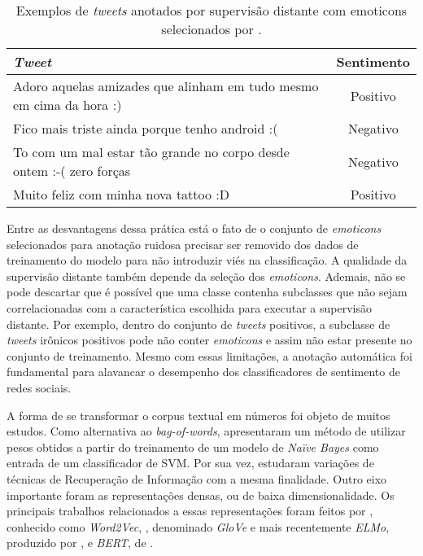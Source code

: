 \begin{table}[h]
    \begin{center}
        \caption{Exemplos de \textit{tweets} anotados por supervisão distante
        com emoticons selecionados por \citet{go09}.}
        \begin{tabular}{| p{10cm} | c |}
        \hline
        \textbf{\textit{Tweet}} & \textbf{Sentimento} \\ \hline
        Adoro aquelas amizades que alinham em tudo mesmo em cima da hora :) & Positivo \\ \hline
        Fico mais triste ainda porque tenho android :( & Negativo\\ \hline
        To com um mal estar tão grande no corpo desde ontem :-( zero forças & Negativo\\ \hline
        Muito feliz com minha nova tattoo :D & Positivo \\ \hline
        \end{tabular}
        \label{tab:supervision_tweets}
    \end{center}
\end{table}

Entre as desvantagens dessa prática está o fato de o conjunto de
\textit{emoticons} selecionados para anotação ruidosa precisar ser removido
dos dados de treinamento do modelo para não introduzir viés na classificação.
A qualidade da supervisão distante também depende da seleção dos
\textit{emoticons}.
Ademais, não se pode descartar que é possível que uma classe contenha subclasses que
não sejam correlacionadas com a característica escolhida para executar a
supervisão distante.
Por exemplo, dentro do conjunto de \textit{tweets} positivos, a subclasse de
\textit{tweets} irônicos positivos pode não conter \textit{emoticons} e assim
não estar presente no conjunto de treinamento.
Mesmo com essas limitações, a anotação automática foi fundamental para alavancar
o desempenho dos classificadores de sentimento de redes sociais.


A forma de se transformar o corpus textual em números foi objeto de muitos
estudos.
Como alternativa ao \textit{bag-of-words}, \citet{wang12} apresentaram um método
de utilizar pesos obtidos a partir do treinamento de um modelo de
\textit{Naïve Bayes} como entrada de um classificador de SVM.
Por sua vez, \citet{paltoglou10} estudaram variações de técnicas de Recuperação
de Informação com a mesma finalidade.
Outro eixo importante foram as representações densas, ou de baixa
dimensionalidade.
Os principais trabalhos relacionados a essas representações foram feitos por
\citet{mikolov13}, conhecido como \textit{Word2Vec}, \citet{pennington14},
denominado \textit{GloVe} e mais recentemente \textit{ELMo}, produzido por
\citet{peters18}, e \textit{BERT}, de \citet{devlin18}.

